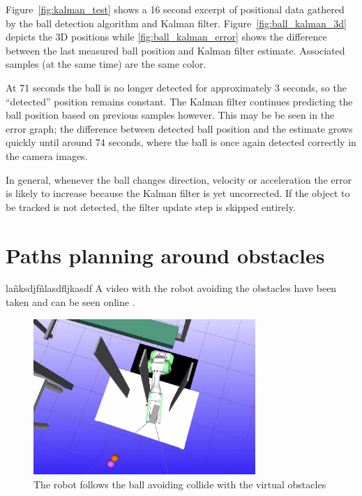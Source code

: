 Figure~\ref{fig:kalman_test} shows a 16 second excerpt of positional data gathered by the ball detection algorithm and Kalman filter.
Figure~\ref{fig:ball_kalman_3d} depicts the 3D positions while \ref{fig:ball_kalman_error} shows the difference between the last measured ball position and Kalman filter estimate. Associated samples (at the same time) are the same color.

At 71 seconds the ball is no longer detected for approximately 3 seconds, so the ``detected'' position remains constant. The Kalman filter continues predicting the ball position based on previous samples however. This may be be seen in the error graph; the difference between detected ball position and the estimate grows quickly until around 74 seconds, where the ball is once again detected correctly in the camera images.

In general, whenever the ball changes direction, velocity or acceleration the error is likely to increase because the Kalman filter is yet uncorrected. If the object to be tracked is not detected, the filter update step is skipped entirely.


\section{Paths planning around obstacles}
lañksdjfñlasdfljkasdf
A video with the robot avoiding the obstacles have been taken and can be seen online \cite{results2}.
\begin{figure}[!ht]
    \centering
    \includegraphics[width=0.75\textwidth]{figures/collision_avoidance}
    \caption{The robot follows the ball avoiding collide with the virtual obstacles}
    \label{fig:collision_avoidance}
\end{figure}